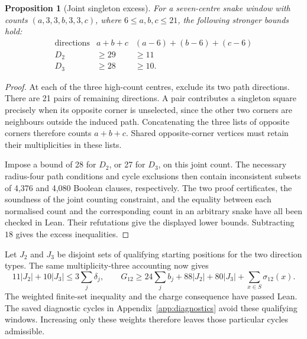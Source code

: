 \documentclass[11pt,a4paper]{article}
\newtheorem{proposition}[theorem]{Proposition}
\theoremstyle{definition}
\theoremstyle{remark}
\begin{document}
\begin{proposition}[Joint singleton excess]\label{prop:joint-singleton-excess}
For a seven-centre snake window with counts $(a,3,3,b,3,3,c)$, where $6\le a,b,c\le21$, the following stronger bounds hold:
\[
\begin{array}{c|c|c}
\text{directions}&a+b+c& (a-6)+(b-6)+(c-6)\\\hline
D_2&\ge29&\ge11\\
D_3&\ge28&\ge10.
\end{array}
\]
\end{proposition}
\begin{proof}
At each of the three high-count centres, exclude its two path directions. There are 21 pairs of remaining directions. A pair contributes a singleton square precisely when its opposite corner is unselected, since the other two corners are neighbours outside the induced path. Concatenating the three lists of opposite corners therefore counts $a+b+c$. Shared opposite-corner vertices must retain their multiplicities in these lists.

Impose a bound of 28 for $D_2$, or 27 for $D_3$, on this joint count. The necessary radius-four path conditions and cycle exclusions then contain inconsistent subsets of 4,376 and 4,080 Boolean clauses, respectively. The two proof certificates, the soundness of the joint counting constraint, and the equality between each normalised count and the corresponding count in an arbitrary snake have all been checked in Lean. Their refutations give the displayed lower bounds. Subtracting $18$ gives the excess inequalities.
\end{proof}

Let $J_2$ and $J_3$ be disjoint sets of qualifying starting positions for the two direction types. The same multiplicity-three accounting now gives
\[
11|J_2|+10|J_3|\le3\sum_j\delta_j,
\qquad
G_{12}\ge24\sum_j b_j+88|J_2|+80|J_3|+\sum_{x\in S}\sigma_{12}(x).
\]
The weighted finite-set inequality and the charge consequence have passed Lean. The saved diagnostic cycles in Appendix~\ref{app:diagnostics} avoid these qualifying windows. Increasing only these weights therefore leaves those particular cycles admissible.
\end{document}
